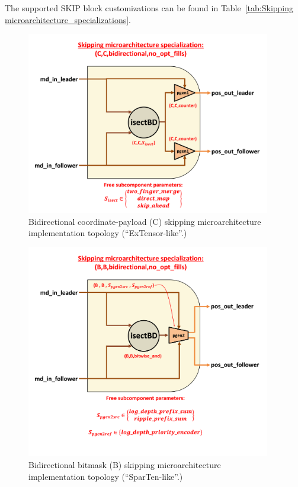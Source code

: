 The supported SKIP block customizations can be found in Table~\ref{tab:Skipping microarchitecture_specializations}.

\begin{figure}[H]
    \centering
    \includegraphics[width=0.95\textwidth]{figures/SKIP_C_C_bidirectional_no_opt_fills.png}
    \caption{Bidirectional coordinate-payload (C) skipping microarchitecture implementation topology (``ExTensor-like''\cite{extensor}.)}
    \label{fig:SKIP_C_C_bidirectional_no_opt_fills}
\end{figure}

\begin{figure}[H]
    \centering
    \includegraphics[width=0.95\textwidth]{figures/SKIP_B_B_bidirectional_no_opt_fills.png}
    \caption{Bidirectional bitmask (B) skipping microarchitecture implementation topology (``SparTen-like''\cite{sparten}.)}
    \label{fig:SKIP_B_B_bidirectional_no_opt_fills}
\end{figure}

